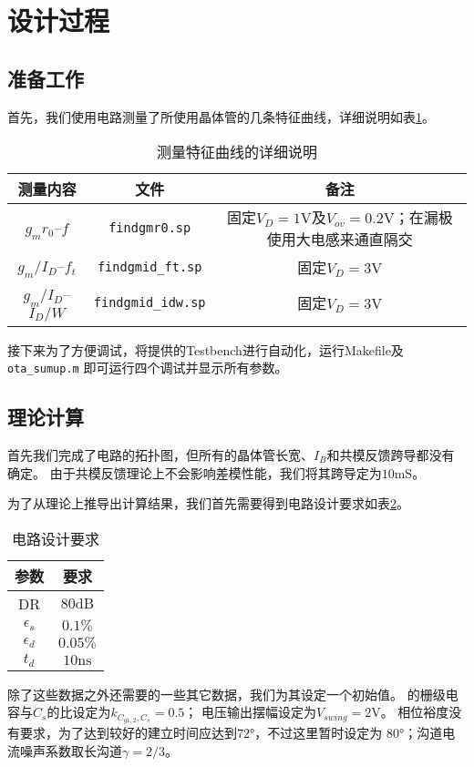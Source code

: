 \documentclass[a4paper]{article}
\newcommand{\uV}{\si{\volt}}
\newcommand{\uns}{\si{\nano\second}}
\newcommand{\umS}{\si{\milli\siemens}}
\newcommand{\udB}{\si{\deci\bel}}
\newcommand{\udeg}{\si{\degree}}
\begin{document}
\section{设计过程}
\subsection{准备工作}
首先，我们使用电路测量了所使用晶体管的几条特征曲线，详细说明如表\ref{finds}。
\begin{table}
  \begin{center}
    \begin{tabular}{ccc}
      测量内容 & 文件 & 备注 \\\hline
      $g_mr_0$--$f$ & \texttt{findgmr0.sp} & 
            固定$V_D=1\uV$及$V_{ov}=0.2\uV$；在漏极使用大电感来通直隔交 \\
      $g_m/I_D$--$f_t$ & \texttt{findgmid\_ft.sp} &
            固定$V_D=3\uV$    \\
      $g_m/I_D$--$I_D/W$ & \texttt{findgmid\_idw.sp} &
            固定$V_D=3\uV$    
    \end{tabular}
  \end{center}
  \caption{测量特征曲线的详细说明}
  \label{finds}
\end{table}

接下来为了方便调试，将提供的Testbench进行自动化，运行Makefile及\texttt{ota\_sumup.m}
即可运行四个调试并显示所有参数。

\subsection{理论计算}
首先我们完成了电路的拓扑图，但所有的晶体管长宽、$I_B$和共模反馈跨导都没有确定。
由于共模反馈理论上不会影响差模性能，我们将其跨导定为$10\umS$。

为了从理论上推导出计算结果，我们首先需要得到电路设计要求如表\ref{requirements}。
\begin{table}
  \begin{center}
    \begin{tabular}{cc}
      参数 & 要求 \\\hline
      DR & $80\udB$ \\
      $\epsilon_s$ & $0.1\%$ \\
      $\epsilon_d$ & $0.05\%$ \\
      $t_d$ & $10\uns$ \\
    \end{tabular}
  \end{center}
  \caption{电路设计要求}
  \label{requirements}
\end{table}
除了这些数据之外还需要的一些其它数据，我们为其设定一个初始值。
的栅级电容与$C_s$的比设定为$k_{C_{g1,2},C_s}=0.5$；
电压输出摆幅设定为$V_{swing}=2\uV$。
相位裕度没有要求，为了达到较好的建立时间应达到$72\udeg$，不过这里暂时设定为
$80\udeg$；沟道电流噪声系数取长沟道$\gamma=2/3$。
\end{document}
